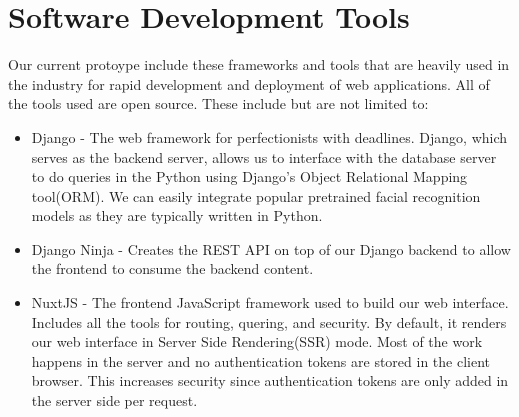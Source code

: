\section{Software Development Tools}
\label{sec:devtools}
Our current protoype include these frameworks and tools that are heavily used in the industry for rapid development and deployment of web applications. All of the tools used are open source. These include but are not limited to:

\begin{itemize}
	\item	Django - The web framework for perfectionists with deadlines. Django, which serves as the backend server, allows us to interface with the database server to do queries in the Python using Django's Object Relational Mapping tool(ORM). We can easily integrate popular pretrained facial recognition models as they are typically written in Python.
\end{itemize}

\begin{itemize}
	\item	Django Ninja - Creates the REST API on top of our Django backend to allow the frontend to consume the backend content.
\end{itemize}

\begin{itemize}
	\item	NuxtJS - The frontend JavaScript framework used to build our web interface. Includes all the tools for routing, quering, and security. By default, it renders our web interface in Server Side Rendering(SSR) mode. Most of the work happens in the server and no authentication tokens are stored in the client browser. This increases security since authentication tokens are only added in the server side per request.
\end{itemize}

